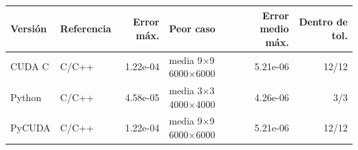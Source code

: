 \begin{tabular}{llrlrr}
\toprule
Versión & Referencia & Error máx. & Peor caso & Error medio máx. & Dentro de tol. \\
\midrule
CUDA C & C/C++ & 1.22e-04 & media 9$\times$9 6000$\times$6000 & 5.21e-06 & 12/12 \\
Python & C/C++ & 4.58e-05 & media 3$\times$3 4000$\times$4000 & 4.26e-06 & 3/3 \\
PyCUDA & C/C++ & 1.22e-04 & media 9$\times$9 6000$\times$6000 & 5.21e-06 & 12/12 \\
\bottomrule
\end{tabular}
